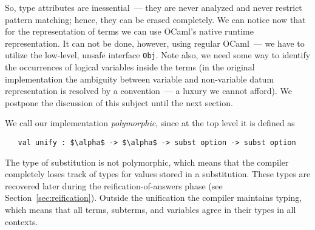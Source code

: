 So, type attributes are inessential~--- they are never analyzed and never restrict pattern matching; hence,
they can be erased completely. 
We can notice now that for the representation of terms we can use OCaml's native runtime representation. 
It can not be done, however, using regular OCaml~--- we have to utilize the low-level, unsafe interface \lstinline{Obj}. 
Note also, we need some way to identify the occurrences of logical variables inside the terms (in the original \miniKanren
implementation the ambiguity between variable and non-variable datum representation is resolved by a convention~--- a luxury 
we cannot afford).  We postpone the discussion of this subject until the next section.



We call our implementation \emph{polymorphic}, since at the top level it is defined as

\begin{lstlisting}
   val unify : $\alpha$ -> $\alpha$ -> subst option -> subst option
\end{lstlisting}

The type of substitution is not polymorphic, which means that the compiler completely loses track
of types for values stored in a substitution. These types are recovered later during the reification-of-answers phase (see Section~\ref{sec:reification}).
Outside the unification the compiler maintains typing, which means that all terms, subterms, and variables agree in their types
in all contexts.
